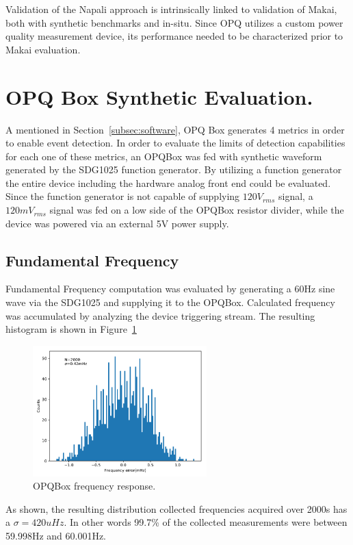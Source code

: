 Validation of the Napali approach is intrinsically linked to validation of Makai, both with synthetic benchmarks and in-situ.
Since OPQ utilizes a custom power quality measurement device, its performance needed to be characterized prior to Makai evaluation.

\section{OPQ Box Synthetic Evaluation.}\label{sec:opq-box-characterization.}
A mentioned in Section~\ref{subsec:software}, OPQ Box generates 4 metrics in order to enable event detection.
In order to evaluate the limits of detection capabilities for each one of these metrics, an OPQBox was fed with synthetic waveform generated by the SDG1025 function generator.
By utilizing a function generator the entire device including the hardware analog front end could be evaluated.
Since the function generator is not capable of supplying $120V_{rms}$ signal, a $120mV_{rms}$ signal was fed on a low side of the OPQBox resistor divider, while the device was powered via an external 5V power supply.

\subsection{Fundamental Frequency}

Fundamental Frequency computation was evaluated by generating a 60Hz sine wave via the SDG1025 and supplying it to the OPQBox.
Calculated frequency was accumulated by analyzing the device triggering stream.
The resulting histogram is shown in Figure~\ref{fig:expdes:1}
\begin{figure}[ht!]
    \begin{center}
        \includegraphics[width=0.6\textwidth]{img/box_eval/frequency_rms.pdf}
    \end{center}
    \caption{OPQBox frequency response.}
    \label{fig:expdes:1}
\end{figure}
As shown, the resulting distribution collected frequencies acquired over 2000s has a $\sigma=420uHz$.
In other words 99.7\% of the collected measurements were between 59.998Hz and 60.001Hz.

